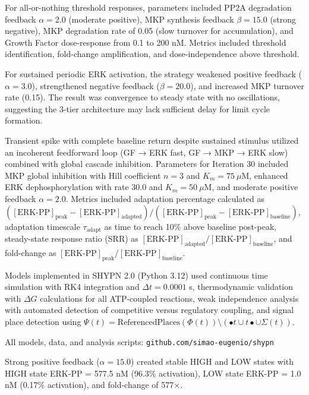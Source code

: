 \documentclass[twocolumn,11pt]{article}
\begin{document}
For all-or-nothing threshold responses, parameters included PP2A degradation feedback $\alpha = 2.0$ (moderate positive), MKP synthesis feedback $\beta = 15.0$ (strong negative), MKP degradation rate of 0.05 (slow turnover for accumulation), and Growth Factor dose-response from 0.1 to 200 nM. Metrics included threshold identification, fold-change amplification, and dose-independence above threshold.

For sustained periodic ERK activation, the strategy weakened positive feedback ($\alpha = 3.0$), strengthened negative feedback ($\beta = 20.0$), and increased MKP turnover rate (0.15). The result was convergence to steady state with no oscillations, suggesting the 3-tier architecture may lack sufficient delay for limit cycle formation.

Transient spike with complete baseline return despite sustained stimulus utilized an incoherent feedforward loop (GF → ERK fast, GF → MKP → ERK slow) combined with global cascade inhibition. Parameters for Iteration 30 included MKP global inhibition with Hill coefficient $n=3$ and $K_m=75~\mu$M, enhanced ERK dephosphorylation with rate 30.0 and $K_m=50~\mu$M, and moderate positive feedback $\alpha = 2.0$. Metrics included adaptation percentage calculated as $([\text{ERK-PP}]_{\text{peak}} - [\text{ERK-PP}]_{\text{adapted}}) / ([\text{ERK-PP}]_{\text{peak}} - [\text{ERK-PP}]_{\text{baseline}})$, adaptation timescale $\tau_{\text{adapt}}$ as time to reach 10\% above baseline post-peak, steady-state response ratio (SRR) as $[\text{ERK-PP}]_{\text{adapted}} / [\text{ERK-PP}]_{\text{baseline}}$, and fold-change as $[\text{ERK-PP}]_{\text{peak}} / [\text{ERK-PP}]_{\text{baseline}}$.

Models implemented in SHYPN 2.0 (Python 3.12) used continuous time simulation with RK4 integration and $\Delta t = 0.0001$ s, thermodynamic validation with $\Delta G$ calculations for all ATP-coupled reactions, weak independence analysis with automated detection of competitive versus regulatory coupling, and signal place detection using $\Psi(t) = \text{ReferencedPlaces}(\Phi(t)) \setminus (\bullet t \cup t\bullet \cup \Sigma(t))$.


All models, data, and analysis scripts: \texttt{github.com/simao-eugenio/shypn}

Strong positive feedback ($\alpha = 15.0$) created stable HIGH and LOW states with HIGH state ERK-PP = 577.5 nM (96.3\% activation), LOW state ERK-PP = 1.0 nM (0.17\% activation), and fold-change of 577×.
\end{document}
